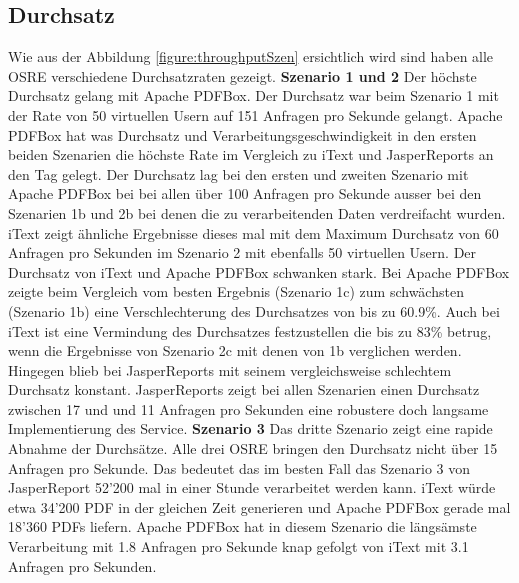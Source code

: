 \documentclass[main.tex]{subfiles}
\begin{document}
\subsection{Durchsatz}
Wie aus der Abbildung \ref{figure:throughputSzen} ersichtlich wird sind haben alle OSRE verschiedene Durchsatzraten gezeigt. 
\newline
\textbf{Szenario 1 und 2} \newline
Der höchste Durchsatz gelang mit Apache PDFBox. Der Durchsatz war beim Szenario 1 mit der Rate von 50 virtuellen Usern auf 151 Anfragen pro Sekunde gelangt.  Apache PDFBox hat was Durchsatz und Verarbeitungsgeschwindigkeit in den ersten beiden Szenarien die höchste Rate im Vergleich zu iText und JasperReports an den Tag gelegt. 
Der Durchsatz lag bei den ersten und zweiten Szenario mit Apache PDFBox bei bei allen über 100 Anfragen pro Sekunde ausser bei den Szenarien 1b und 2b bei denen die zu verarbeitenden Daten verdreifacht wurden. 
iText zeigt ähnliche Ergebnisse dieses mal mit dem Maximum Durchsatz von 60 Anfragen pro Sekunden im Szenario 2 mit ebenfalls 50 virtuellen Usern. Der Durchsatz von iText und Apache PDFBox schwanken stark. Bei Apache PDFBox zeigte beim Vergleich vom besten Ergebnis (Szenario 1c) zum schwächsten (Szenario 1b) eine Verschlechterung des Durchsatzes von bis zu 60.9\%. Auch bei iText ist eine Vermindung des Durchsatzes festzustellen die  bis zu 83\% betrug, wenn die Ergebnisse von Szenario 2c mit denen von 1b verglichen werden. Hingegen blieb bei JasperReports mit seinem vergleichsweise schlechtem Durchsatz konstant. JasperReports zeigt bei allen Szenarien einen Durchsatz zwischen 17 und und 11 Anfragen pro Sekunden eine robustere doch langsame Implementierung des Service.\newline 
\textbf{Szenario 3}
\newline
Das dritte Szenario zeigt eine rapide Abnahme der Durchsätze. Alle drei OSRE bringen den Durchsatz nicht über 15 Anfragen pro Sekunde. Das bedeutet das im besten Fall das Szenario 3 von JasperReport 52'200 mal in einer Stunde verarbeitet werden kann. iText würde etwa 34'200 PDF in der gleichen Zeit generieren und Apache PDFBox gerade mal 18'360 PDFs liefern. 
Apache PDFBox hat in diesem Szenario die längsämste Verarbeitung mit 1.8 Anfragen pro Sekunde knap gefolgt von iText mit 3.1 Anfragen pro Sekunden. 
\end{document}
